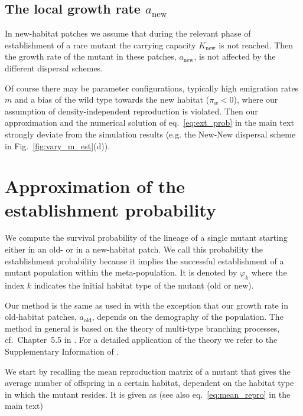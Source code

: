 \documentclass[a4paper,11pt]{scrartcl}
\newcommand{\chg}[1]{\textcolor{change}{#1}}
\begin{document}
\subsection*{The local growth rate $a_{\text{new}}$}
\chg{In new-habitat patches we assume that during the relevant phase of establishment of a rare mutant the carrying capacity $K_{\text{new}}$ is not reached. Then the growth rate of the mutant in these patches, $a_{\text{new}}$, is not affected by the different dispersal schemes.} 

\chg{Of course there may be parameter configurations, typically high emigration rates $m$ and a bias of the wild type towards the new habitat ($\pi_w < 0$), where our assumption of density-independent reproduction is violated. Then our approximation and the numerical solution of eq.~\eqref{eq:ext_prob} in the main text strongly deviate from the simulation results (e.g. the New-New dispersal scheme in Fig.~\ref{fig:vary_m_est}(d)).}

\newpage
\section{Approximation of the establishment probability}
We compute the survival probability \chg{of the lineage} of a single mutant starting either in an old- or in a new-habitat patch. We call this probability the establishment probability because it implies the successful establishment of a mutant population within the meta-population. It is denoted by $\varphi_k$ where the index $k$ indicates the initial habitat type of the mutant (old or new).

Our method is the same as used in \citet{tomasini_2018} with the exception that our growth rate in old-habitat patches, $a_{\text{old}}$, depends on the demography of the population. The method in general is based on the theory of multi-type branching processes, cf.~Chapter~5.5 in \citet{haccou_book}. For a detailed application of the theory we refer to the Supplementary Information of \citet{tomasini_2018}. 

We start by recalling the mean reproduction matrix of a mutant that gives the average number of offspring in a certain habitat, dependent on the habitat type in which the mutant resides. It is given as (see also eq.~\eqref{eq:mean_repro} in the main text)
\end{document}

